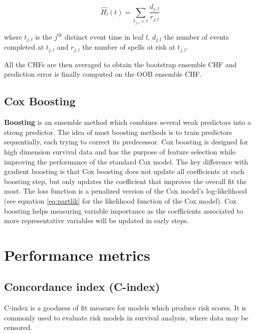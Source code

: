 \documentclass[
]{book}
\begin{document}
\begin{equation}
  \widehat{H_l}(t) = \sum_{t_{j, l} < t} \frac{d_{j,l}}{r_{j,l}}
  \label{eq:chf}
\end{equation}

where \(t_{j,l}\) is the \(j^{\text{th}}\) distinct event time in leaf \(l\), \(d_{j,l}\) the number of events completed at \(t_{j,l}\) and \(r_{j,l}\) the number of spells at risk at \(t_{j,l}\).

All the CHFs are then averaged to obtain the bootstrap ensemble CHF and prediction error is finally computed on the OOB ensemble CHF.

\hypertarget{cox-boosting}{%
\subsection{Cox Boosting}\label{cox-boosting}}

\textbf{Boosting} is an ensemble method which combines several weak predictors into a strong predictor. The idea of most boosting methods is to train predictors sequentially, each trying to correct its predecessor. Cox boosting \citep{COX_BOOSTING} is designed for high dimension survival data and has the purpose of feature selection while improving the performance of the standard Cox model. The key difference with gradient boosting is that Cox boosting does not update all coefficients at each boosting step, but only updates the coefficient that improves the overall fit the most. The loss function is a penalized version of the Cox model's log-likelihood (see equation \eqref{eq:partlik} for the likelihood function of the Cox model). Cox boosting helps measuring variable importance as the coefficients associated to more representative variables will be updated in early steps.

\hypertarget{performance-metrics}{%
\section{Performance metrics}\label{performance-metrics}}

\hypertarget{concordance-index-c-index}{%
\subsection{Concordance index (C-index)}\label{concordance-index-c-index}}

C-index is a goodness of fit measure for models which produce risk scores. It is commonly used to evaluate risk models in survival analysis, where data may be censored.
\end{document}
